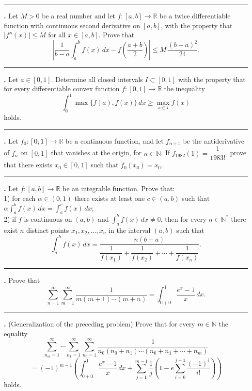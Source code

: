 \documentclass[11pt]{article}
\newcounter{probnum}
\newenvironment{problembox}{\par\noindent\rule{\linewidth}{0.5pt}\vspace{5pt}\par}{\vspace{2pt}}
\begin{document}
\begin{problembox}
\textbf{\theprobnum.} Let $M > 0$ be a real number and let $f : [a,b] \to \mathbb{R}$ be a twice differentiable function with continuous second derivative on $[a,b]$, with the property that $|f''(x)| \le M$ for all $x \in [a,b]$. Prove that
\[
\left|\frac{1}{b-a}\int_a^b f(x)\,dx - f\left(\frac{a+b}{2}\right)\right| \le M\,\frac{(b-a)^2}{24}.
\]
\end{problembox}

\begin{problembox}
\textbf{\theprobnum.} Let $a \in [0,1]$. Determine all closed intervals $I \subset [0,1]$ with the property that for every differentiable convex function $f : [0,1] \to \mathbb{R}$ the inequality
\[
\int_0^1 \max\{f(a), f(x)\}\,dx \ge \max_{x \in I} f(x)
\]
holds.
\end{problembox}

\begin{problembox}
\textbf{\theprobnum.} Let $f_0 : [0,1] \to \mathbb{R}$ be a continuous function, and let $f_{n+1}$ be the antiderivative of $f_n$ on $[0,1]$ that vanishes at the origin, for $n \in \mathbb{N}$. If $f_{1982}(1) = \dfrac{1}{1983!}$, prove that there exists $x_0 \in [0,1]$ such that $f_0(x_0) = x_0$.
\end{problembox}

\begin{problembox}
\textbf{\theprobnum.} Let $f : [a,b] \to \mathbb{R}$ be an integrable function. Prove that:\\
1) for each $\alpha \in (0,1)$ there exists at least one $c \in (a,b)$ such that $\displaystyle\alpha \int_a^b f(x)\,dx = \int_a^c f(x)\,dx$;\\
2) if $f$ is continuous on $(a,b)$ and $\displaystyle\int_a^b f(x)\,dx \ne 0$, then for every $n \in \mathbb{N}^*$ there exist $n$ distinct points $x_1, x_2, \ldots, x_n$ in the interval $(a,b)$ such that
\[
\int_a^b f(x)\,dx = \frac{n(b-a)}{\dfrac{1}{f(x_1)} + \dfrac{1}{f(x_2)} + \cdots + \dfrac{1}{f(x_n)}}.
\]
\end{problembox}

\begin{problembox}
\textbf{\theprobnum.} Prove that
\[
\sum_{n=1}^{\infty} \sum_{m=1}^{\infty} \frac{1}{m(m+1)\cdots(m+n)} = \int_{0+0}^{1} \frac{e^x-1}{x}\,dx.
\]
\end{problembox}

\begin{problembox}
\textbf{\theprobnum.} (Generalization of the preceding problem) Prove that for every $m \in \mathbb{N}$ the equality
\[
\sum_{n_m=1}^{\infty} \cdots \sum_{n_1=1}^{\infty} \sum_{n_0=1}^{\infty} \frac{1}{n_0(n_0+n_1)\cdots(n_0+n_1+\cdots+n_m)}
\]
\[
= (-1)^{m-1} \left( \int_{0+0}^{1} \frac{e^x-1}{x}\,dx + \sum_{j=1}^{m-1} \frac{1}{j}\left(1 - e\sum_{i=0}^{j-1} \frac{(-1)^i}{i!}\right) \right)
\]
holds.
\end{problembox}
\end{document}
